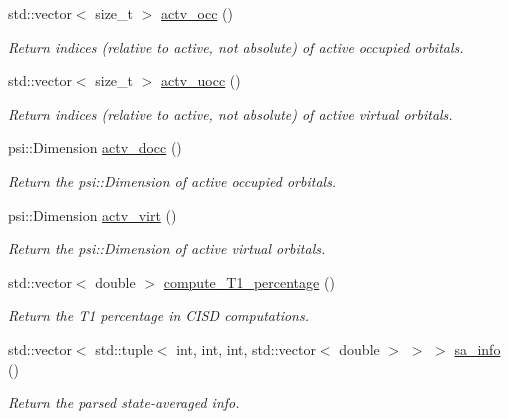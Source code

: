 \begin{DoxyCompactItemize}
std\+::vector$<$ size\+\_\+t $>$ \mbox{\hyperlink{classforte_1_1_f_c_i___m_o_ab542e74bc4d3d53fe1cf1a6d25eb093b}{actv\+\_\+occ}} ()
\begin{DoxyCompactList}\small\item\em Return indices (relative to active, not absolute) of active occupied orbitals. \end{DoxyCompactList}\item 
std\+::vector$<$ size\+\_\+t $>$ \mbox{\hyperlink{classforte_1_1_f_c_i___m_o_a0e5d71c5e278b8e12c2d3b4ae24667df}{actv\+\_\+uocc}} ()
\begin{DoxyCompactList}\small\item\em Return indices (relative to active, not absolute) of active virtual orbitals. \end{DoxyCompactList}\item 
psi\+::\+Dimension \mbox{\hyperlink{classforte_1_1_f_c_i___m_o_acacb2d7ea908564e82fc04b7aa644196}{actv\+\_\+docc}} ()
\begin{DoxyCompactList}\small\item\em Return the psi\+::\+Dimension of active occupied orbitals. \end{DoxyCompactList}\item 
psi\+::\+Dimension \mbox{\hyperlink{classforte_1_1_f_c_i___m_o_ad99d13576ef1e965d1e3b6dd58109bba}{actv\+\_\+virt}} ()
\begin{DoxyCompactList}\small\item\em Return the psi\+::\+Dimension of active virtual orbitals. \end{DoxyCompactList}\item 
std\+::vector$<$ double $>$ \mbox{\hyperlink{classforte_1_1_f_c_i___m_o_a0e22a364c4ca1f758d01b63d545e34d4}{compute\+\_\+\+T1\+\_\+percentage}} ()
\begin{DoxyCompactList}\small\item\em Return the T1 percentage in C\+I\+SD computations. \end{DoxyCompactList}\item 
std\+::vector$<$ std\+::tuple$<$ int, int, int, std\+::vector$<$ double $>$ $>$ $>$ \mbox{\hyperlink{classforte_1_1_f_c_i___m_o_aa191172f2d1053787846c37905f884c0}{sa\+\_\+info}} ()
\begin{DoxyCompactList}\small\item\em Return the parsed state-\/averaged info. \end{DoxyCompactList}\end{DoxyCompactItemize}
